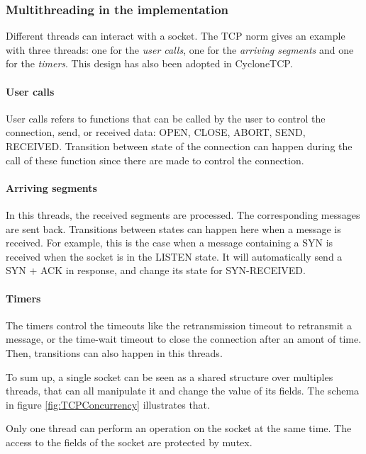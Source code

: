 \documentclass[a4paper, 10pt]{article}
\begin{document}
    \subsubsection{Multithreading in the implementation}

    Different threads can interact with a socket. The TCP norm gives an example with
    three threads: one for the \emph{user calls}, one for the \emph{arriving segments}
    and one for the \emph{timers}. This design has also been adopted in CycloneTCP.
    
    \paragraph{User calls}
    User calls refers to functions that can be called by the user to control the connection,
    send, or received data: OPEN, CLOSE, ABORT, SEND, RECEIVED. Transition between state of
    the connection can happen during the call of these function since there are made to control
    the connection.

    \paragraph{Arriving segments}
    In this threads, the received segments are processed. The corresponding messages are sent back.
    Transitions between states can happen here when a message is received. For example,
    this is the case when a message containing a SYN is received when the socket is in
    the LISTEN state. It will automatically send a SYN + ACK in response, and change
    its state for SYN-RECEIVED.

    \paragraph{Timers}
    The timers control the timeouts like the retransmission timeout to retransmit a message, or
    the time-wait timeout to close the connection after an amont of time. Then, transitions can also
    happen in this threads.

    To sum up, a single socket can be seen as a shared structure over multiples threads, that can all
    manipulate it and change the value of its fields. The schema in figure \ref{fig:TCPConcurrency} illustrates that.
    
    Only one thread can perform an operation on the socket at the same time. The access to the fields of
    the socket are protected by mutex.
\end{document}
